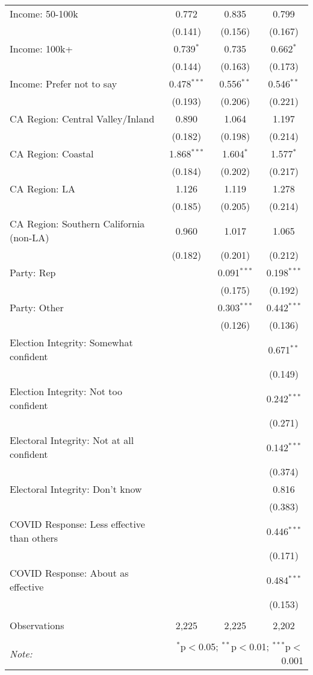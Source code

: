\begin{table}[!htbp]
\begin{tabular}{@{\extracolsep{5pt}}lccc}
  Income: 50-100k & 0.772 & 0.835 & 0.799 \\ 
  & (0.141) & (0.156) & (0.167) \\ 
  Income: 100k+ & 0.739$^{*}$ & 0.735 & 0.662$^{*}$ \\ 
  & (0.144) & (0.163) & (0.173) \\ 
  Income: Prefer not to say & 0.478$^{***}$ & 0.556$^{**}$ & 0.546$^{**}$ \\ 
  & (0.193) & (0.206) & (0.221) \\ 
  CA Region: Central Valley/Inland & 0.890 & 1.064 & 1.197 \\ 
  & (0.182) & (0.198) & (0.214) \\ 
  CA Region: Coastal & 1.868$^{***}$ & 1.604$^{*}$ & 1.577$^{*}$ \\ 
  & (0.184) & (0.202) & (0.217) \\ 
  CA Region: LA & 1.126 & 1.119 & 1.278 \\ 
  & (0.185) & (0.205) & (0.214) \\ 
  CA Region: Southern California (non-LA) & 0.960 & 1.017 & 1.065 \\ 
  & (0.182) & (0.201) & (0.212) \\ 
  Party: Rep &  & 0.091$^{***}$ & 0.198$^{***}$ \\ 
  &  & (0.175) & (0.192) \\ 
  Party: Other &  & 0.303$^{***}$ & 0.442$^{***}$ \\ 
  &  & (0.126) & (0.136) \\ 
  Election Integrity: Somewhat confident &  &  & 0.671$^{**}$ \\ 
  &  &  & (0.149) \\ 
  Election Integrity: Not too confident &  &  & 0.242$^{***}$ \\ 
  &  &  & (0.271) \\ 
  Electoral Integrity: Not at all confident &  &  & 0.142$^{***}$ \\ 
  &  &  & (0.374) \\ 
  Electoral Integrity: Don't know &  &  & 0.816 \\ 
  &  &  & (0.383) \\ 
  COVID Response: Less effective than others &  &  & 0.446$^{***}$ \\ 
  &  &  & (0.171) \\ 
  COVID Response: About as effective &  &  & 0.484$^{***}$ \\ 
  &  &  & (0.153) \\ 
 \hline \\[-1.8ex] 
Observations & 2,225 & 2,225 & 2,202 \\ 
\hline 
\hline \\[-1.8ex] 
\textit{Note:}  & \multicolumn{3}{r}{$^{*}$p$<$0.05; $^{**}$p$<$0.01; $^{***}$p$<$0.001} \\ 
\end{tabular} 
\end{table} 
